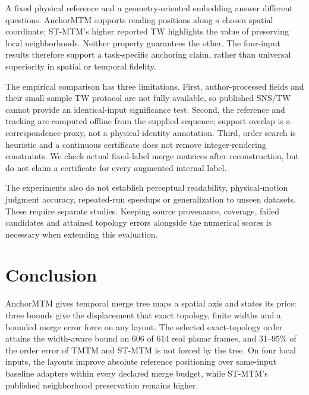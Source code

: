 \documentclass[review]{vgtc}
\begin{document}
A fixed physical reference and a geometry-oriented embedding answer different questions. AnchorMTM supports reading positions along a chosen spatial coordinate; ST-MTM's higher reported TW highlights the value of preserving local neighborhoods. Neither property guarantees the other. The four-input results therefore support a task-specific anchoring claim, rather than universal superiority in spatial or temporal fidelity.

The empirical comparison has three limitations. First, author-processed fields and their small-sample TW protocol are not fully available, so published SNS/TW cannot provide an identical-input significance test. Second, the reference and tracking are computed offline from the supplied sequence; support overlap is a correspondence proxy, not a physical-identity annotation. Third, order search is heuristic and a continuous certificate does not remove integer-rendering constraints. We check actual fixed-label merge matrices after reconstruction, but do not claim a certificate for every augmented internal label.

The experiments also do not establish perceptual readability, physical-motion judgment accuracy, repeated-run speedups or generalization to unseen datasets. These require separate studies. Keeping source provenance, coverage, failed candidates and attained topology errors alongside the numerical scores is necessary when extending this evaluation.
\section{Conclusion}
AnchorMTM gives temporal merge tree maps a spatial axis and states its price: three bounds give the displacement that exact topology, finite widths and a bounded merge error force on any layout. The selected exact-topology order attains the width-aware bound on 606 of 614 real planar frames, and 31--95\% of the order error of TMTM and ST-MTM is not forced by the tree. On four local inputs, the layouts improve absolute reference positioning over same-input baseline adapters within every declared merge budget, while ST-MTM's published neighborhood preservation remains higher.
\FloatBarrier
\begingroup
{}


\endgroup
\end{document}
